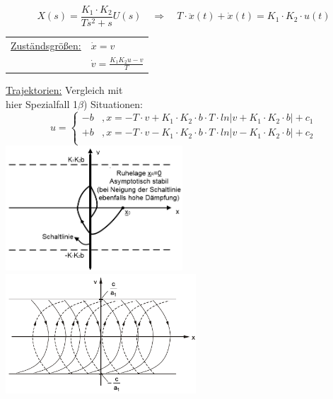 \documentclass[openany,a4paper,11pt]{book}
\begin{document}
\[X(s)=\frac{K_1 \cdot K_2}{Ts^2+s}U(s) \quad \Rightarrow \quad T\cdot\ddot{x}(t)+\dot{x}(t)=K_1\cdot K_2\cdot u(t)\]
\begin{tabular}{ll}
\uline{Zuständsgrößen:} & $\dot{x}=v$\\
& $\dot{v}=\frac{K_1 K_2 u-v}{T}$\\
\end{tabular}
\uline{Trajektorien:} Vergleich mit \\
hier Spezialfall 1$\beta$) Situationen: 
\[u = \left \{%
\begin{array}{lcrcl}
     -b & ,x=-T\cdot v+K_1\cdot K_2\cdot b\cdot T\cdot ln|v+K_1\cdot K_2\cdot b|+c_1\\
     +b & ,x=-T\cdot v-K_1\cdot K_2\cdot b\cdot T\cdot ln|v-K_1\cdot K_2\cdot b|+c_2\\
\end{array} \right.\]
\includegraphics[width=2.6in]{imgs/NLR19.png}\includegraphics[width=2.8in]{imgs/NLR19_1.png}
\end{document}
